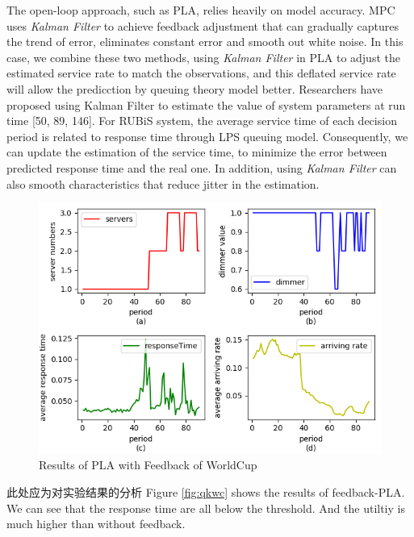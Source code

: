 \documentclass[sigconf]{acmart}
\begin{document}
The open-loop approach, such as PLA, relies heavily on model accuracy. MPC uses \textit{Kalman Filter} to achieve feedback adjustment that can gradually captures the trend of error, eliminates constant error and smooth out white noise. In this case,  we combine these two methods, using \textit{Kalman Filter} in PLA to adjust the estimated service rate to match the observations, and this deflated service rate will allow the predicction by queuing theory model better.
Researchers have proposed using Kalman Filter to estimate the value of system parameters at run time [50, 89, 146]. For RUBiS system, the average service time of each decision period is related to response time through LPS queuing model. Consequently, we can update the estimation of the service time, to minimize the error between predicted response time and the real one. In addition, using \textit{Kalman Filter} can also smooth characteristics that reduce jitter in the estimation.
\begin{figure}[h]
	\centering
	\includegraphics[width=\linewidth]{qkwc}
	\caption{Results of PLA with Feedback of WorldCup}
	
\end{figure}
此处应为对实验结果的分析
Figure \ref{fig:qkwc} shows the results of feedback-PLA. We can see that the response time are all below the threshold. And the utiltiy is much higher than without feedback.
\end{document}
